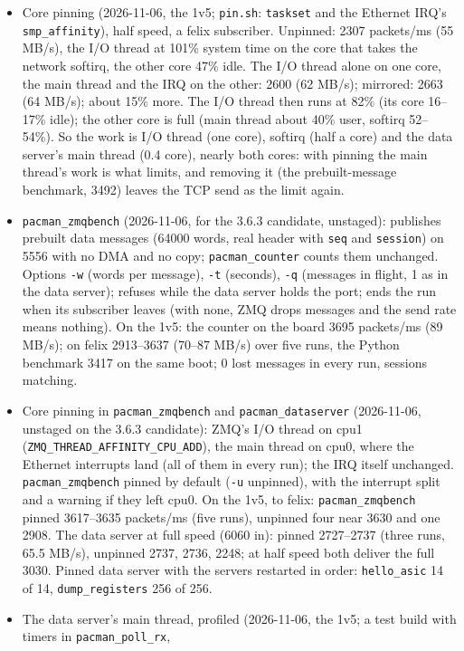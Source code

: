 \documentclass[11pt]{article}
\newcommand{\h}[1]{\texttt{#1}}
\begin{document}
\begin{itemize}
  competes with the I/O thread.
\item Core pinning (2026-11-06, the 1v5;  \h{pin.sh}:  \h{taskset} and the Ethernet IRQ's \h{smp\_affinity}), half
  speed, a felix subscriber.  Unpinned:  2307 packets/ms (55 MB/s), the I/O thread at 101\% system time on the core
  that takes the network softirq, the other core 47\% idle.  The I/O thread alone on one core, the main thread and the
  IRQ on the other:  2600 (62 MB/s);  mirrored:  2663 (64 MB/s);  about 15\% more.  The I/O thread then runs at 82\%
  (its core 16--17\% idle);  the other core is full (main thread about 40\% user, softirq 52--54\%).  So the work is
  I/O thread (one core), softirq (half a core) and the data server's main thread (0.4 core), nearly both cores:
  with pinning the main thread's work is what limits, and removing it (the prebuilt-message benchmark, 3492) leaves
  the TCP send as the limit again.
\item \h{pacman\_zmqbench} (2026-11-06, for the 3.6.3 candidate, unstaged):  publishes prebuilt data messages (64000
  words, real header with \h{seq} and \h{session}) on 5556 with no DMA and no copy;  \h{pacman\_counter} counts them
  unchanged.  Options \h{-w} (words per message), \h{-t} (seconds), \h{-q} (messages in flight, 1 as in the data
  server);  refuses while the data server holds the port;  ends the run when its subscriber leaves (with none, ZMQ
  drops messages and the send rate means nothing).  On the 1v5:  the counter on the board 3695 packets/ms
  (89 MB/s);  on felix 2913--3637 (70--87 MB/s) over five runs, the Python benchmark 3417 on the same boot;  0 lost
  messages in every run, sessions matching.
\item Core pinning in \h{pacman\_zmqbench} and \h{pacman\_dataserver} (2026-11-06, unstaged on the 3.6.3 candidate):
  ZMQ's I/O thread on cpu1 (\h{ZMQ\_THREAD\_AFFINITY\_CPU\_ADD}), the main thread on cpu0, where the Ethernet interrupts
  land (all of them in every run);  the IRQ itself unchanged.  \h{pacman\_zmqbench} pinned by default (\h{-u}
  unpinned), with the interrupt split and a warning if they left cpu0.  On the 1v5, to felix:
  \h{pacman\_zmqbench} pinned 3617--3635 packets/ms (five runs), unpinned four near 3630 and one 2908.  The data
  server at full speed (6060 in):  pinned 2727--2737 (three runs, 65.5 MB/s), unpinned 2737, 2736, 2248;  at half
  speed both deliver the full 3030.  Pinned data server with the servers restarted in order:  \h{hello\_asic} 14 of 14,
  \h{dump\_registers} 256 of 256.
\item The data server's main thread, profiled (2026-11-06, the 1v5;  a test build with timers in \h{pacman\_poll\_rx},

\end{itemize}
\end{document}
